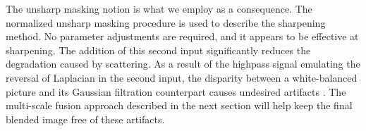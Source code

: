 \documentclass[conference]{IEEEtran}
\begin{document}
\begin{table}[htpb]
\caption{Objective Measurements: Edge and Pixel-based Image quality assessment}
\begin{center}
\label{tab1}
\end{center}
\end{table}

The unsharp masking notion is what we employ as a consequence. The normalized unsharp masking procedure is used to describe the sharpening method. No parameter adjustments are required, and it appears to be effective at sharpening. The addition of this second input significantly reduces the degradation caused by scattering. As a result of the highpass signal emulating the reversal of Laplacian in the second input, the disparity between a white-balanced picture and its Gaussian filtration counterpart causes undesired artifacts \cite{mertens2009exposure}. The multi-scale fusion approach described in the next section will help keep the final blended image free of these artifacts.
\end{document}

